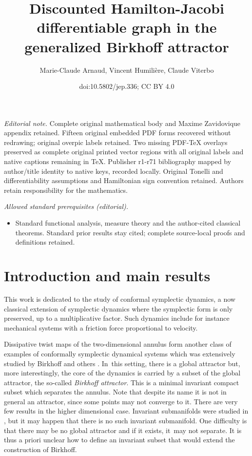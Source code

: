 \documentclass[10pt]{amsart}
\title{Discounted Hamilton-Jacobi differentiable graph in the generalized Birkhoff attractor}
\author{Marie-Claude Arnaud, Vincent Humilière, Claude Viterbo}
\date{doi:10.5802/jep.336; CC BY 4.0}
\theoremstyle{definition}
\providecommand{\mainmatter}{}\providecommand{\backmatter}{}
\begin{document}
\maketitle
\noindent\textit{Editorial note.} Complete original mathematical body and Maxime Zavidovique appendix retained. Fifteen original embedded PDF forms recovered without redrawing; original overpic labels retained. Two missing PDF-TeX overlays preserved as complete original printed vector regions with all original labels and native captions remaining in TeX. Publisher r1-r71 bibliography mapped by author/title identity to native keys, recorded locally. Original Tonelli and differentiability assumptions and Hamiltonian sign convention retained. Authors retain responsibility for the mathematics.\par\medskip
\noindent\textit{Allowed standard prerequisites (editorial).}\begin{itemize}
\item Standard functional analysis, measure theory and the author-cited classical theorems. Standard prior results stay cited; complete source-local proofs and definitions retained.
\end{itemize}\medskip
\vspace*{-\baselineskip}
{\let\footnotemark\relax\tableofcontents}
\mainmatter

\section{Introduction and main results}

This work is dedicated to the study of conformal symplectic dynamics, a now classical
extension of symplectic dynamics where the symplectic form is only preserved, up to a multiplicative factor.
Such dynamics include for instance
mechanical systems with a friction force proportional
to velocity.

Dissipative twist maps of the two-dimensional annulus form another class of examples of conformally symplectic dynamical systems which was extensively studied by Birkhoff and others \cite{Birkhoff-attractor,Charpentier-1,Charpentier-2,LeCalvez-Birkhoff1, LeCalvez-Birkhoff2}. In~this setting, there is a global attractor but, more interestingly, the core of the dynamics is carried by a subset of the global attractor, the so-called \emph{Birkhoff attractor}. This is a minimal invariant compact subset which separates the annulus. Note that despite its name it is not in general an attractor, since some points may not converge to it. There are very few results in the higher dimensional case. Invariant submanifolds were studied in \cite{Arnaud-Fejoz}, but it may happen that there is no such invariant submanifold. One difficulty is that there may be no global attractor and if it exists, it~may not separate. It is thus a priori unclear how to define an invariant subset that would extend the construction of Birkhoff.
\end{document}
